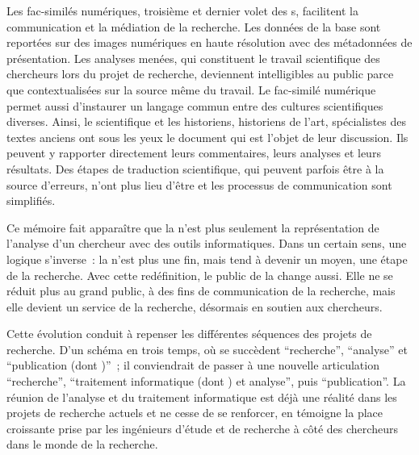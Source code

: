 Les fac-similés numériques, troisième et dernier volet des s, facilitent la communication et la médiation de la recherche. Les données de la base sont reportées sur des images numériques en haute résolution avec des métadonnées de présentation. Les analyses menées, qui constituent le travail scientifique des chercheurs lors du projet de recherche, deviennent intelligibles au public parce que contextualisées sur la source même du travail. Le fac-similé numérique permet aussi d’instaurer un langage commun entre des cultures scientifiques diverses. Ainsi, le scientifique et les historiens, historiens de l’art, spécialistes des textes anciens ont sous les yeux le document qui est l’objet de leur discussion. Ils peuvent y rapporter directement leurs commentaires, leurs analyses et leurs résultats. Des étapes de traduction scientifique, qui peuvent parfois être à la source d’erreurs, n'ont plus lieu d’être et les processus de communication sont simplifiés.\\\par
Ce mémoire fait apparaître que la  n’est plus seulement la représentation de l’analyse d’un chercheur avec des outils informatiques. Dans un certain sens, une logique s’inverse~: la  n’est plus une fin, mais tend à devenir un moyen, une étape de la recherche. Avec cette redéfinition, le public de la  change aussi. Elle ne se réduit plus au grand public, à des fins de communication de la recherche, mais elle devient un service de la recherche, désormais en soutien aux chercheurs.\par
Cette évolution conduit à repenser les différentes séquences des projets de recherche. D’un schéma en trois temps, où se succèdent \enquote{recherche}, \enquote{analyse} et \enquote{publication (dont )}~; il conviendrait de passer à une nouvelle articulation \enquote{recherche}, \enquote{traitement informatique (dont ) et analyse}, puis \enquote{publication}. La réunion de l’analyse et du traitement informatique est déjà une réalité dans les projets de recherche actuels et ne cesse de se renforcer, en témoigne la place croissante prise par les ingénieurs d’étude et de recherche à côté des chercheurs dans le monde de la recherche.